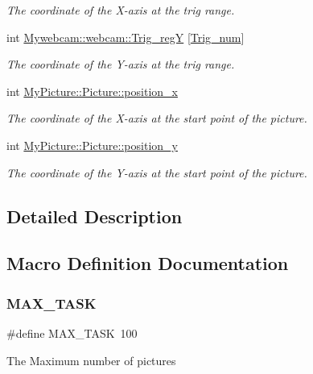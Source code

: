 \begin{DoxyCompactItemize}
\begin{DoxyCompactList}\small\item\em The coordinate of the X-\/axis at the trig range. \end{DoxyCompactList}\item 
\mbox{\label{group___the_gac305426389277260c7adecf3a23172d6}} 
int \hyperlink{group___the_gac305426389277260c7adecf3a23172d6}{Mywebcam\+::webcam\+::\+Trig\+\_\+regY} \mbox{[}\hyperlink{group___the_ga3572c6451d34aaf557cfb88ee365cf16}{Trig\+\_\+num}\mbox{]}
\begin{DoxyCompactList}\small\item\em The coordinate of the Y-\/axis at the trig range. \end{DoxyCompactList}\item 
\mbox{\label{group___the_ga5f9040e5635fe0db42cfcf7f2f2219a6}} 
int \hyperlink{group___the_ga5f9040e5635fe0db42cfcf7f2f2219a6}{My\+Picture\+::\+Picture\+::position\+\_\+x}
\begin{DoxyCompactList}\small\item\em The coordinate of the X-\/axis at the start point of the picture. \end{DoxyCompactList}\item 
\mbox{\label{group___the_ga86b8259886daf41584d67aca98ef9b95}} 
int \hyperlink{group___the_ga86b8259886daf41584d67aca98ef9b95}{My\+Picture\+::\+Picture\+::position\+\_\+y}
\begin{DoxyCompactList}\small\item\em The coordinate of the Y-\/axis at the start point of the picture. \end{DoxyCompactList}\end{DoxyCompactItemize}


\subsection{Detailed Description}


\subsection{Macro Definition Documentation}
\mbox{\label{group___the_gaeea0462bd5cef9250c58b8d66da810be}} 
\subsubsection{\texorpdfstring{M\+A\+X\+\_\+\+T\+A\+SK}{MAX\_TASK}}
{\footnotesize\ttfamily \#define M\+A\+X\+\_\+\+T\+A\+SK~100}

The Maximum number of pictures 